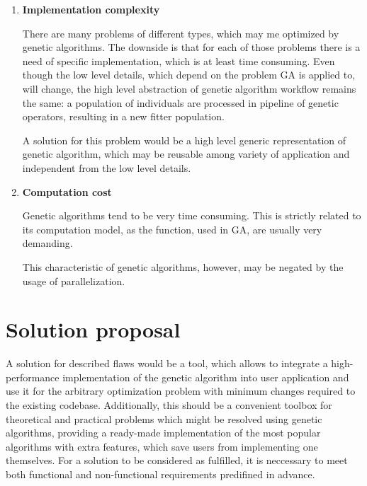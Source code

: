 \begin{enumerate}
\item \textbf{Implementation complexity}

There are many problems of different types, which may me optimized by genetic algorithms. The downside is that for each of those problems there is a need of specific implementation, which is at least time consuming. Even though the low level details, which depend on the problem GA is applied to, will change, the high level abstraction of genetic algorithm workflow remains the same: a population of individuals are processed in pipeline of genetic operators, resulting in a new fitter population.

A solution for this problem would be a high level generic representation of genetic algorithm, which may be reusable among variety of application and independent from the low level details. 
\medbreak

\item \textbf{Computation cost}

Genetic algorithms tend to be very time consuming. This is strictly related to its computation model, as the function, used in GA, are usually very demanding.

This characteristic of genetic algorithms, however, may be negated by the usage of parallelization.
\medbreak

\end{enumerate}

\section{Solution proposal}

A solution for described flaws would be a tool, which allows to integrate a high-performance implementation of the genetic algorithm into user application and use it for the arbitrary optimization problem with minimum changes required to the existing codebase. Additionally, this should be a convenient toolbox for theoretical and practical problems which might be resolved using genetic algorithms, providing a ready-made implementation of the most popular algorithms with extra features, which save users from implementing one themselves. For a solution to be considered as fulfilled, it is neccessary to meet both functional and non-functional requirements predifined in advance.

